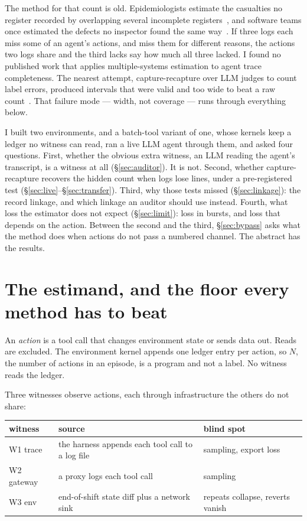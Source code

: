 \documentclass[11pt]{article}
\begin{document}
The method for that count is old. Epidemiologists estimate the casualties no
register recorded by overlapping several incomplete
registers~\citep{fienberg1972,bird2018mse}, and software teams once estimated the
defects no inspector found the same way~\citep{eick1992inspection,petersson2004inspection}.
If three logs each miss some of an agent's actions, and miss them for different
reasons, the actions two logs share and the third lacks say how much all three
lacked. I found no published work that applies multiple-systems estimation to
agent trace completeness. The nearest attempt, capture-recapture over LLM judges
to count label errors, produced intervals that were valid and too wide to beat a
raw count~\citep{kansal2026labels}. That failure mode --- width, not coverage ---
runs through everything below.

I built two environments, and a batch-tool variant of one, whose kernels keep a ledger no
witness can read, ran a live LLM agent through them, and asked four questions. First, whether the obvious
extra witness, an LLM reading the agent's transcript, is a witness at all
(\S\ref{sec:auditor}). It is not. Second, whether capture-recapture recovers the
hidden count when logs lose lines, under a pre-registered test
(\S\ref{sec:live}--\S\ref{sec:transfer}). Third, why those tests missed
(\S\ref{sec:linkage}): the record linkage, and which linkage an auditor should
use instead. Fourth, what loss the estimator does not expect (\S\ref{sec:limit}):
loss in bursts, and loss that depends on the action. Between the second and the
third, \S\ref{sec:bypass} asks what the method does when actions do not pass a
numbered channel. The abstract has the results.

\section{The estimand, and the floor every method has to beat}
\label{sec:estimand}

An \emph{action} is a tool call that changes environment state or sends data out.
Reads are excluded. The environment kernel appends one ledger entry per action,
so $N$, the number of actions in an episode, is a program and not a label. No
witness reads the ledger.

Three witnesses observe actions, each through infrastructure the others do not
share:

\begin{center}
\begin{tabular}{lll}
\toprule
witness & source & blind spot \\
\midrule
W1 trace & the harness appends each tool call to a log file & sampling, export loss \\
W2 gateway & a proxy logs each tool call & sampling \\
W3 env & end-of-shift state diff plus a network sink & repeats collapse, reverts vanish \\
\bottomrule
\end{tabular}
\end{center}
\end{document}

